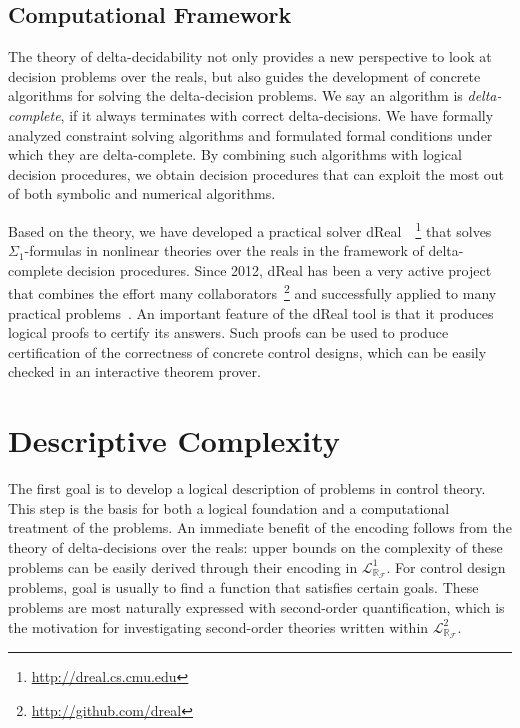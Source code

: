 \documentclass[11pt]{article}
\newcommand{\lrf}{\mathcal{L}_{\mathbb{R}_{\mathcal{F}}}}
\theoremstyle{definition}
\begin{document}
\subsection{Computational Framework}\label{dreal}

The theory of delta-decidability not only provides a new perspective to look at decision problems over the reals, but also guides the development of concrete algorithms for solving the delta-decision problems. We say an algorithm is {\em delta-complete}, if it always terminates with correct delta-decisions. We have formally analyzed constraint solving algorithms and formulated formal conditions under which they are delta-complete. By combining such algorithms with logical decision procedures, we obtain decision procedures that can exploit the most out of both symbolic and numerical algorithms. 

Based on the theory, we have developed a practical solver dReal~\cite{DBLP:conf/cade/GaoKC13,DBLP:conf/fmcad/GaoKC13}~\footnote{\url{http://dreal.cs.cmu.edu}} that solves $\Sigma_1$-formulas in nonlinear theories over the reals in the framework of delta-complete decision procedures. Since 2012, dReal has been a very active project that combines the effort many collaborators~\footnote{\url{http://github.com/dreal}} and successfully applied to many practical problems~\cite{DBLP:conf/cade/GaoKC13,DBLP:conf/fmcad/GaoKC13,DBLP:conf/hybrid/KapinskiDSA14,DBLP:conf/fmcad/GaoKC13}. An important feature of the dReal tool is that it produces logical proofs to certify its answers. Such proofs can be used to produce certification of the correctness of concrete control designs, which can be easily checked in an interactive theorem prover. 

\section{Descriptive Complexity}\label{dc}

The first goal is to develop a logical description of problems in control theory. This step is the basis for both a logical foundation and a computational treatment of the problems. An immediate benefit of the encoding follows from the theory of delta-decisions over the reals: upper bounds on the complexity of these problems can be easily derived through their encoding in $\lrf^1$. For control design problems, goal is usually to find a function that satisfies certain goals. These problems are most naturally expressed with second-order quantification, which is the motivation for investigating second-order theories written within $\lrf^2$. 
\end{document}
